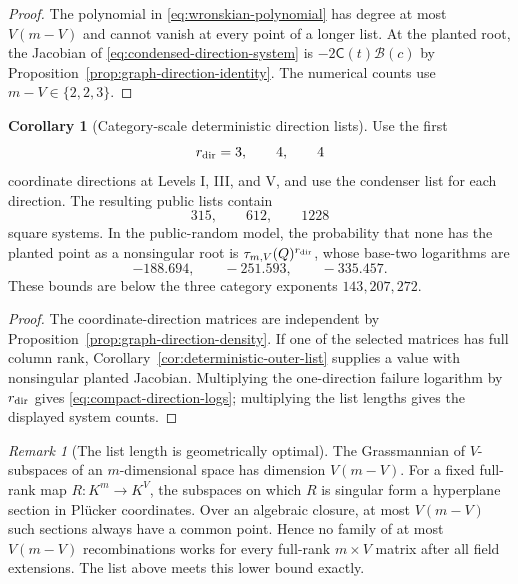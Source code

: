 \documentclass[11pt,a4paper]{article}
\theoremstyle{definition}
\newtheorem{corollary}[theorem]{Corollary}
\theoremstyle{remark}
\newtheorem{remark}[theorem]{Remark}
\begin{document}
\begin{proof}
The polynomial in \eqref{eq:wronskian-polynomial} has degree at most
$V(m-V)$ and cannot vanish at every point of a longer list.  At the planted
root, the Jacobian of \eqref{eq:condensed-direction-system} is
$-2\mathsf C(t)\mathcal B(c)$ by
Proposition~\ref{prop:graph-direction-identity}.  The numerical counts use
$m-V\in\{2,2,3\}$.
\end{proof}

\begin{corollary}[Category-scale deterministic direction lists]\label{cor:compact-direction-list}
Use the first
\[
 r_{\rm dir}=3,\qquad4,\qquad4
\]
coordinate directions at Levels I, III, and V, and use the condenser list for
each direction.  The resulting public lists contain
\[
315,\qquad612,\qquad1228
\]
square systems.  In the public-random model, the probability that none has the
planted point as a nonsingular root is
$\tau_{m,V}(Q)^{r_{\rm dir}}$, whose base-two logarithms are
\begin{equation}\label{eq:compact-direction-logs}
 -188.694,\qquad-251.593,\qquad-335.457.
\end{equation}
These bounds are below the three category exponents $143,207,272$.
\end{corollary}

\begin{proof}
The coordinate-direction matrices are independent by
Proposition~\ref{prop:graph-direction-density}.  If one of the selected
matrices has full column rank,
Corollary~\ref{cor:deterministic-outer-list} supplies a value with nonsingular
planted Jacobian.  Multiplying the one-direction failure logarithm by
$r_{\rm dir}$ gives \eqref{eq:compact-direction-logs}; multiplying the list
lengths gives the displayed system counts.
\end{proof}

\begin{remark}[The list length is geometrically optimal]\label{rem:condenser-optimal}
The Grassmannian of $V$-subspaces of an $m$-dimensional space has dimension
$V(m-V)$.  For a fixed full-rank map $R:K^m\to K^V$, the subspaces on which
$R$ is singular form a hyperplane section in Pl\"ucker coordinates.  Over an
algebraic closure, at most $V(m-V)$ such sections always have a common point.
Hence no family of at most $V(m-V)$ recombinations works for every full-rank
$m\times V$ matrix after all field extensions.  The list above meets this
lower bound exactly.
\end{remark}
\end{document}
